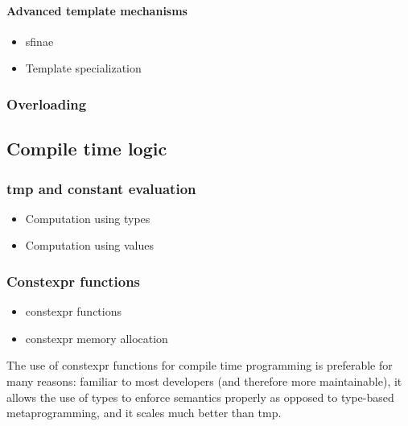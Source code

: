 \documentclass[../main]{subfiles}
\begin{document}
\paragraph{Advanced \cpp template mechanisms}

\begin{itemize}
\item \acrfull{sfinae}
\item Template specialization
\end{itemize}

\subsubsection{Overloading}

\subsection{Compile time logic}

\subsubsection{\acrlong{tmp} and constant evaluation}

\begin{itemize}
\item Computation using types
\item Computation using values
\end{itemize}

\subsubsection{Constexpr functions}

\begin{itemize}
\item \gls{constexpr} functions
\item \gls{constexpr} memory allocation
\end{itemize}

The use of \gls{constexpr} functions for compile time programming is preferable
for many reasons: familiar to most \cpp developers (and therefore more
maintainable), it allows the use of types to enforce semantics properly
as opposed to type-based metaprogramming, and it scales much better than
\acrshort{tmp}.
\end{document}
